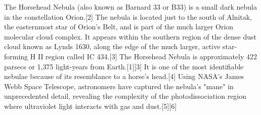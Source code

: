 The Horsehead Nebula (also known as Barnard 33 or B33) is a small dark nebula in the constellation Orion.[2] The nebula is located just to the south of Alnitak, the easternmost star of Orion's Belt, and is part of the much larger Orion molecular cloud complex. It appears within the southern region of the dense dust cloud known as Lynds 1630, along the edge of the much larger, active star-forming H II region called IC 434.[3] The Horsehead Nebula is approximately 422 parsecs or 1,375 light-years from Earth.[1][3] It is one of the most identifiable nebulae because of its resemblance to a horse's head.[4] Using NASA's James Webb Space Telescope, astronomers have captured the nebula's "mane" in unprecedented detail, revealing the complexity of the photodissociation region where ultraviolet light interacts with gas and dust.[5][6]

